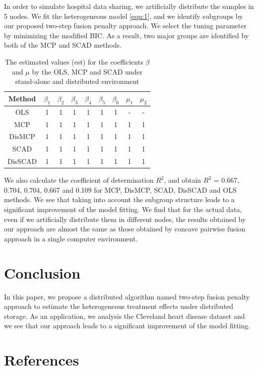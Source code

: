 \documentclass[review]{elsarticle}
\begin{document}
In order to simulate hospital data sharing, we artificially distribute the samples in 5 nodes. We fit the heterogeneous model \ref{equ:1}, and we identify subgroups by our proposed two-step fusion penalty approach. We select the tuning parameter by minimizing the modified BIC. As a result, two major groups are identified by both of the MCP and SCAD methods.
\begin{table}[H]
	\centering
	\fontsize{5.5}{6}\selectfont
	\begin{threeparttable}
		\caption{The estimated values (est) for the coefficients $\beta$ and $\mu$ by the OLS, MCP and SCAD under stand-alone and distributed environment}
		\label{tab:3}
		\begin{tabular}{ccccccccc}
			\toprule
			Method&$\beta_1$&$\beta_2$&$\beta_3$&$\beta_4$&$\beta_5$&$\beta_6$&$\mu_1$&$\mu_2$\\
			\midrule
			OLS&1&1&1&1&1&1&-&-\\
			MCP&1&1&1&1&1&1&1&1\\
			DisMCP&1&1&1&1&1&1&1&1\\
			SCAD&1&1&1&1&1&1&1&1\\
			DisSCAD&1&1&1&1&1&1&1&1\\
			\bottomrule
		\end{tabular}
	\end{threeparttable}
\end{table}
We also calculate the coefficient of determination $R^2$, and obtain $R^2$ = 0.667, 0.704, 0.704, 0.667 and 0.109 for MCP, DisMCP, SCAD, DisSCAD and OLS methods. We see that taking into account the subgroup structure leads to a significant improvement of the model fitting. We find that for the actual data, even if we artificially distribute them in different nodes, the results obtained by our approach are almost the same as those obtained by concave pairwise fusion approach in a single computer environment.
\section{Conclusion}
In this paper, we propose a distributed algorithm named two-step fusion penalty approach to estimate the heterogeneous treatment effects under distributed storage. As an application, we analysis the Cleveland heart disease dataset and we see that our approach leads to a significant improvement of the model fitting.
\section*{References}


\end{document}
